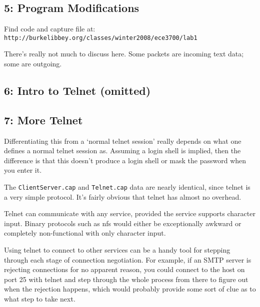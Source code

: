 \documentclass[10pt,letterpaper,titlepage]{article}
\begin{document}
\subsection*{5: Program Modifications}

Find code and capture file at: \\
\texttt{http://burkelibbey.org/classes/winter2008/ece3700/lab1}

There's really not much to discuss here. Some packets are incoming text data; some are outgoing.

\subsection*{6: Intro to Telnet (omitted)}

\subsection*{7: More Telnet}

Differentiating this from a `normal telnet session' really depends on what one defines a normal telnet session as. Assuming a login shell is implied, then the difference is that this doesn't produce a login shell or mask the password when you enter it. 

The \texttt{ClientServer.cap} and \texttt{Telnet.cap} data are nearly identical, since telnet is a very simple protocol. It's fairly obvious that telnet has almost no overhead.

Telnet can communicate with any service, provided the service supports character input. Binary protocols such as nfs would either be exceptionally awkward or completely non-functional with only character input.

Using telnet to connect to other services can be a handy tool for stepping through each stage of connection negotiation. For example, if an SMTP server is rejecting connections for no apparent reason, you could connect to the host on port 25 with telnet and step through the whole process from there to figure out when the rejection happens, which would probably provide some sort of clue as to what step to take next.
\end{document}
